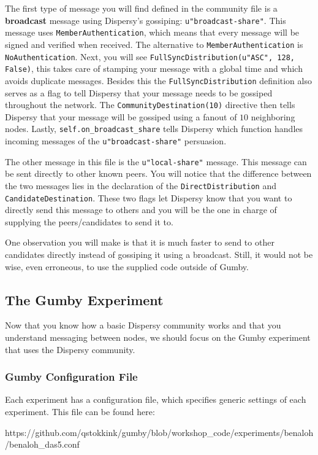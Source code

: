 \documentclass{article}
\begin{document}
The first type of message you will find defined in the community file is a \textbf{broadcast} message using Dispersy's gossiping: \texttt{u"broadcast-share"}.
This message uses \texttt{MemberAuthentication}, which means that every message will be signed  and verified when received.
The alternative to \texttt{MemberAuthentication} is \texttt{NoAuthentication}.
Next, you will see \texttt{FullSyncDistribution(u"ASC", 128, False)}, this takes care of stamping your message with a global time and which avoids duplicate messages.
Besides this the \texttt{FullSyncDistribution} definition also serves as a flag to tell Dispersy that your message needs to be gossiped throughout the network.
The \texttt{CommunityDestination(10)} directive then tells Dispersy that your message will be gossiped using a fanout of $10$ neighboring nodes.
Lastly, \texttt{self.on\_broadcast\_share} tells Dispersy which function handles incoming messages of the \texttt{u"broadcast-share"} persuasion.

The other message in this file is the \texttt{u"local-share"} message.
This message can be sent directly to other known peers.
You will notice that the difference between the two messages lies in the declaration of the \texttt{DirectDistribution} and \texttt{CandidateDestination}.
These two flags let Dispersy know that you want to directly send this message to others and you will be the one in charge of supplying the peers/candidates to send it to.

One observation you will make is that it is much faster to send to other candidates directly instead of gossiping it using a broadcast.
Still, it would not be wise, even erroneous, to use the supplied code outside of Gumby.

\subsection{The Gumby Experiment}
Now that you know how a basic Dispersy community works and that you understand messaging between nodes, we should focus on the Gumby experiment that uses the Dispersy community.

\subsubsection{Gumby Configuration File}
Each experiment has a configuration file, which specifies generic settings of each experiment.
This file can be found here:

https://github.com/qstokkink/gumby/blob/workshop\_code/experiments/benaloh/benaloh\_das5.conf
\end{document}
